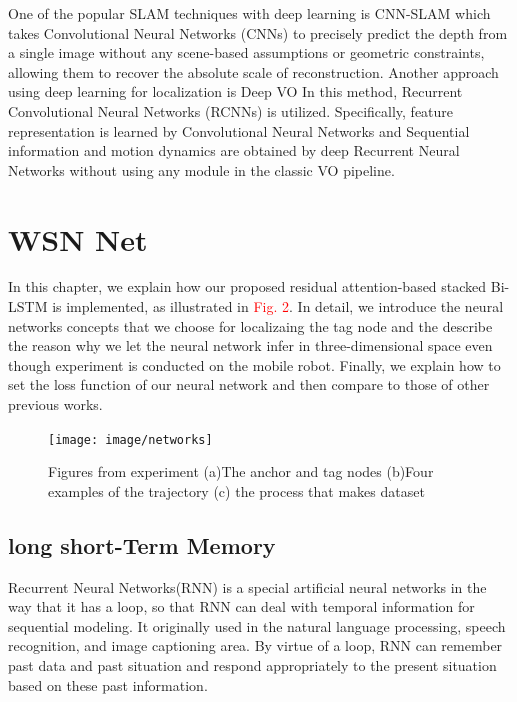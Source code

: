 \documentclass{ieeeaccess}
\begin{document}
One of the popular SLAM techniques with deep learning is CNN-SLAM \cite{tateno2017cnn} which takes Convolutional Neural Networks (CNNs) to precisely predict the depth from a single image without any scene-based assumptions or geometric constraints, allowing them to recover the absolute scale of reconstruction. Another approach using deep learning for localization is Deep VO \cite{clark2017vinet} In this method, Recurrent Convolutional Neural Networks (RCNNs) is utilized. Specifically, feature representation is learned by Convolutional Neural Networks and Sequential information and motion dynamics are obtained by deep Recurrent Neural Networks without using any module in the classic VO pipeline.

\section{WSN Net}

In this chapter, we explain how our proposed residual attention-based stacked Bi-LSTM is implemented, as illustrated in \textcolor{red}{Fig. 2}. 
In detail, we introduce the neural networks concepts that we choose for localizaing the tag node and the describe the reason why we let the neural network infer in three-dimensional space even though experiment is conducted on the mobile robot. Finally, we explain how to set the loss function of our neural network and then compare to those of other previous works.

\begin{figure}[h]
	\centering
	\texttt{[image: image/networks]}
	\caption{Figures from experiment (a)The anchor and tag nodes (b)Four examples of the trajectory (c) the process that makes dataset}
	\label{fig:experiment}
\end{figure}


\subsection{long short-Term Memory}

Recurrent Neural Networks(RNN) is a special artificial neural networks in the way that it has a loop, so that RNN can deal with temporal information for sequential modeling. It originally used in the natural language processing, speech recognition, and image captioning area. By virtue of a loop, RNN can remember past data and past situation and respond appropriately to the present situation based on these past information. 
\end{document}
